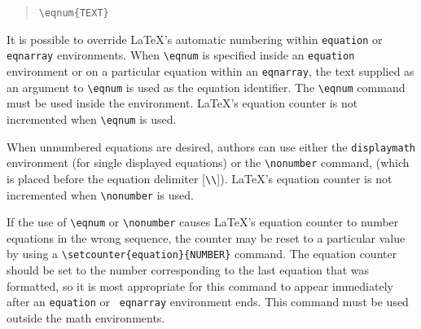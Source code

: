 \begin{quote}
\verb"\eqnum{TEXT}"
\end{quote}

It is possible to override \LaTeX's automatic numbering within 
{\tt equation} or {\tt eqnarray} environments.  When \verb"\eqnum" 
is specified inside an {\tt equation} environment or on a particular 
equation within an {\tt eqnarray}, the text supplied as an argument to 
\verb"\eqnum" is used as the equation identifier.  The \verb"\eqnum" 
command must be used inside the environment.  \LaTeX's equation counter 
is not incremented when \verb"\eqnum" is used.  

When unnumbered equations are desired, authors can use either 
the {\tt displaymath} environment (for single displayed equations) 
or the \verb"\nonumber" command, (which is placed before the 
equation delimiter [\verb"\\"]).  \LaTeX's equation counter is 
not incremented when \verb"\nonumber" is used.

If the use of \verb"\eqnum" or \verb"\nonumber" causes \LaTeX's 
equation counter to number equations in the wrong sequence, the 
counter may be reset to a particular value by using a 
\verb"\setcounter{equation}{NUMBER}" command.  The equation 
counter should be set to the number corresponding to the last 
equation that was formatted, so it is most appropriate for this 
command to appear immediately after an {\tt equation} or {\tt 
eqnarray} environment ends.  This command must be used outside 
the math environments.


